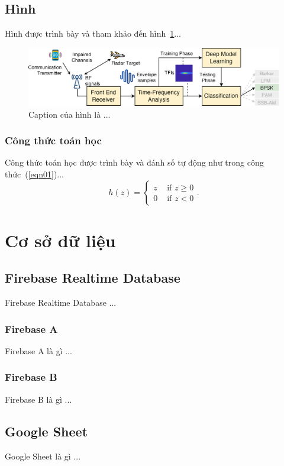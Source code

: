 \subsection{Hình}
Hình được trình bày và tham khảo đến hình~\ref{fig01}...

\begin{figure}[!t]
	\centering
	\includegraphics[width=14cm]{fig/fig01.png}    %
	\caption{Caption của hình là ...}
	\label{fig01}
\end{figure}

\subsubsection{Công thức toán học}
Công thức toán học được trình bày và đánh số tự động như trong công thức~(\ref{eqn01})...
\begin{equation}
h\left ( z \right )=\begin{cases}
z & \text{ if } z\geq 0 \\ 
0 & \text{ if } z < 0
\end{cases}.
\label{eqn01}
\end{equation}

\section{Cơ sở dữ liệu}
\subsection{Firebase Realtime Database}
Firebase Realtime Database ...
\subsubsection{Firebase A}
Firebase A là gì ...
\subsubsection{Firebase B}
Firebase B là gì ...
\subsection{Google Sheet}
Google Sheet là gì ...

